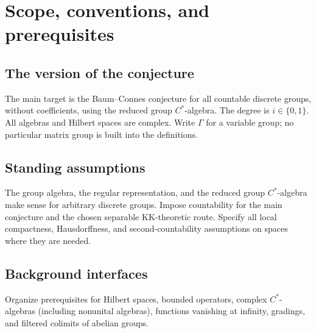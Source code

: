 \chapter{Scope, conventions, and prerequisites}
\label{ch:scope}

\section{The version of the conjecture}
The main target is the Baum--Connes conjecture for all countable discrete
groups, without coefficients, using the reduced group $C^*$-algebra.
The degree is $i\in\{0,1\}$. All algebras and Hilbert spaces are complex.
Write $\Gamma$ for a variable group; no particular matrix group is built
into the definitions.

\section{Standing assumptions}
The group algebra, the regular representation, and the reduced group
$C^*$-algebra make sense for arbitrary discrete groups. Impose countability
for the main conjecture and the chosen separable KK-theoretic route.
Specify all local compactness, Hausdorffness, and second-countability
assumptions on spaces where they are needed.

\section{Background interfaces}
Organize prerequisites for Hilbert spaces, bounded operators, complex
$C^*$-algebras (including nonunital algebras), functions vanishing at infinity,
gradings, and filtered colimits of abelian groups.

